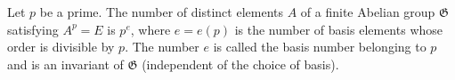 Let $p$ be a prime. The number of distinct elements $A$ of a finite Abelian group $\mathfrak{G}$ satisfying $A^p = E$ is $p^e$, where $e = e(p)$ is the number of basis elements whose order is divisible by $p$. The number $e$ is called the basis number belonging to $p$ and is an invariant of $\mathfrak{G}$ (independent of the choice of basis).
